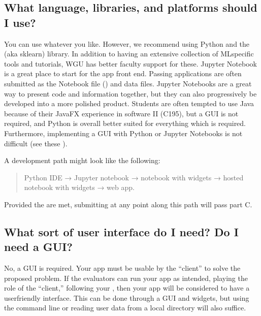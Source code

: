 \documentclass[letterpaper,10pt,english]{jupyterBook}
\begin{document}
\subsection{What language, libraries, and platforms should I use?}
\label{\detokenize{task1:what-language-libraries-and-platforms-should-i-use}}
\sphinxAtStartPar
You can use whatever you like. However, we recommend using Python and the  (aka sklearn) library. In addition to having an extensive collection of ML\sphinxhyphen{}specific tools and tutorials, WGU has better faculty support for these. Jupyter Notebook is a great place to start for the app front end. Passing applications are often submitted as the Notebook file () and data files. Jupyter Notebooks are a great way to present code and information together, but they can also progressively be developed into a more polished product. Students are often tempted to use Java because of their JavaFX experience in software II (C195), but a GUI is not required, and Python is overall better suited for everything which is required. Furthermore, implementing a GUI with Python or Jupyter Notebooks is not difficult (see these {\hyperref[\detokenize{task2_c/example_sup_class/sup_class_ex-ui:sup-class-ex-user-interface}]{}}).

\sphinxAtStartPar
A development path might look like the following:
\begin{quote}

\sphinxAtStartPar
Python IDE → Jupyter notebook → notebook with widgets → hosted notebook with widgets → web app.
\end{quote}

\sphinxAtStartPar
Provided the  are met, submitting at any point along this path will pass part C.


\subsection{What sort of user interface do I need? Do I need a GUI?}
\label{\detokenize{task1:what-sort-of-user-interface-do-i-need-do-i-need-a-gui}}\label{\detokenize{task1:task1-faq-gui}}
\sphinxAtStartPar
No, a GUI is  required. Your app must be usable by the “client” to solve the proposed problem. If the evaluators can run your app as intended, playing the role of the “client,” following your , then your app will be considered to have a user\sphinxhyphen{}friendly interface. This can be done through a GUI and widgets, but using the command line or reading user data from a local directory will also suffice.
\end{document}
